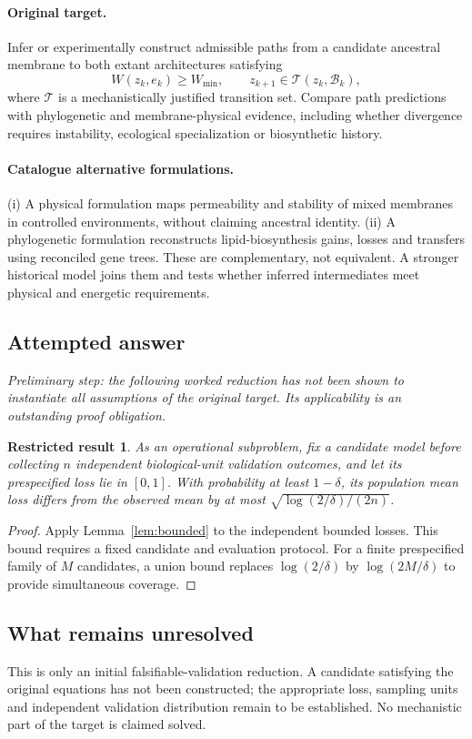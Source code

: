 \documentclass[11pt]{article}
\newtheorem{attemptresult}{Restricted result}[section]
\begin{document}
\paragraph{Original target.}
Infer or experimentally construct admissible paths from a candidate ancestral membrane to both extant architectures satisfying
\[
W(z_k,e_k)\geq W_{\min},\qquad
z_{k+1}\in\mathcal T(z_k,\mathcal B_k),
\]
where $\mathcal T$ is a mechanistically justified transition set. Compare path predictions with phylogenetic and membrane-physical evidence, including whether divergence requires instability, ecological specialization or biosynthetic history.
\paragraph{Catalogue alternative formulations.}
(i) A physical formulation maps permeability and stability of mixed membranes in controlled environments, without claiming ancestral identity. (ii) A phylogenetic formulation reconstructs lipid-biosynthesis gains, losses and transfers using reconciled gene trees. These are complementary, not equivalent. A stronger historical model joins them and tests whether inferred intermediates meet physical and energetic requirements.
\subsection{Attempted answer}
\noindent\emph{Preliminary step: the following worked reduction has not been shown to instantiate all assumptions of the original target. Its applicability is an outstanding proof obligation.}

\begin{attemptresult}
As an operational subproblem, fix a candidate model before collecting $n$ independent biological-unit validation outcomes, and let its prespecified loss lie in $[0,1]$. With probability at least $1-\delta$, its population mean loss differs from the observed mean by at most $\sqrt{\log(2/\delta)/(2n)}$.
\end{attemptresult}
\begin{proof}
Apply Lemma~\ref{lem:bounded} to the independent bounded losses. This bound requires a fixed candidate and evaluation protocol. For a finite prespecified family of $M$ candidates, a union bound replaces $\log(2/\delta)$ by $\log(2M/\delta)$ to provide simultaneous coverage.
\end{proof}
\subsection{What remains unresolved}
This is only an initial falsifiable-validation reduction. A candidate satisfying the original equations has not been constructed; the appropriate loss, sampling units and independent validation distribution remain to be established. No mechanistic part of the target is claimed solved.
\end{document}
